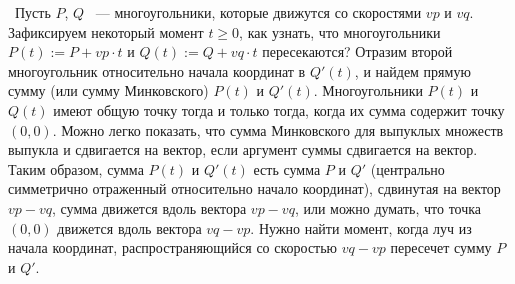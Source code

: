 \indent\indent\ Пусть $P$, $Q$ ~--- многоугольники, которые движутся
со скоростями $vp$ и $vq$.
Зафиксируем некоторый момент $t \ge 0$, как узнать, что многоугольники
$P(t) := P + vp \cdot t$ и $Q(t) := Q + vq \cdot t$ пересекаются?
Отразим второй многоугольник относительно начала координат в $Q'(t)$,
и найдем прямую сумму (или сумму Минковского) $P(t)$ и $Q'(t)$. Многоугольники
$P(t)$ и $Q(t)$ имеют общую точку тогда и только тогда, когда их сумма
содержит точку $(0, 0)$. Можно легко показать, что сумма Минковского для
выпуклых множеств выпукла и сдвигается на вектор, если аргумент суммы
сдвигается на вектор. Таким образом, сумма $P(t)$ и $Q'(t)$ есть сумма
$P$ и $Q'$ (центрально симметрично отраженный относительно начало координат),
сдвинутая на вектор $vp - vq$, сумма движется вдоль вектора $vp - vq$, или
можно думать, что точка $(0, 0)$ движется вдоль вектора $vq - vp$. Нужно найти
момент, когда луч из начала координат, распространяющийся со скоростью
$vq - vp$ пересечет сумму $P$ и $Q'$.


